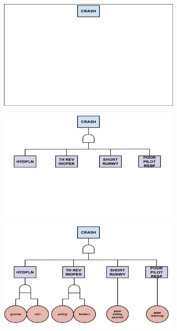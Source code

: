 \documentclass[aspectratio=1610,pdftex,dvipsnames,compress,xcolor={dvipsnames}]{beamer}
\begin{document}
\begin{frame}{}
    \begin{figure}
        \centering
        \includegraphics[width=0.80\textwidth]{fault.tree_plane.1.jpg}
    \end{figure}
\end{frame}


\begin{frame}{}
    \begin{figure}
        \centering
        \includegraphics[width=0.80\textwidth]{fault.tree_plane.2.jpg}
    \end{figure}
\end{frame}


\begin{frame}{}
    \begin{figure}
        \centering
        \includegraphics[width=0.80\textwidth]{fault.tree_plane.3.jpg}
    \end{figure}
\end{frame}
\end{document}
